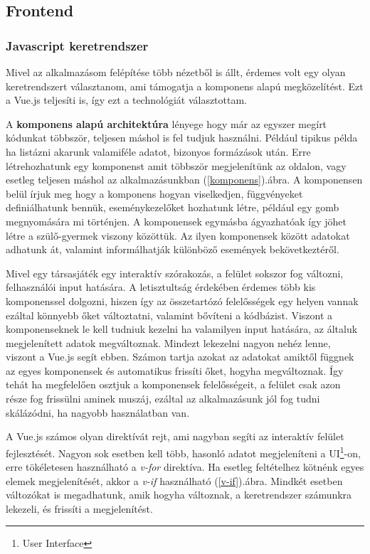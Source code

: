 \documentclass[a4paper,twoside]{article}
\begin{document}
\subsection{Frontend}

\subsubsection{Javascript keretrendszer}
Mivel az alkalmazásom felépítése több nézetből is állt, érdemes volt egy olyan keretrendszert választanom, ami támogatja a komponens 
alapú megközelítést. Ezt a  Vue.js\cite{vuejs} teljesíti is, így ezt a technológiát választottam. 

 A \textbf{komponens alapú architektúra} lényege hogy már az egyszer megírt kódunkat többször, teljesen máshol is fel tudjuk használni. Például tipikus példa 
ha listázni akarunk valamiféle adatot, bizonyos formázások után. Erre létrehozhatunk egy komponenst amit többször megjelenítünk az oldalon, vagy esetleg teljesen máshol az alkalmazásunkban (\ref{komponens}).ábra. A komponensen belül írjuk meg hogy a komponens hogyan viselkedjen, függvényeket definiálhatunk bennük, eseménykezelőket hozhatunk létre, például egy gomb megnyomására mi történjen. A komponensek egymásba ágyazhatóak így jöhet létre a szülő-gyermek viszony közöttük. Az ilyen komponensek között adatokat adhatunk át, valamint informálhatják különböző események bekövetkeztéről. 

Mivel egy társasjáték egy interaktív szórakozás, a felület sokszor fog változni, felhasználói input hatására. A letisztultság érdekében érdemes több kis komponenssel dolgozni, hiszen így az összetartózó felelősségek egy helyen vannak ezáltal könnyebb őket változtatni, valamint bővíteni a kódbázist. Viszont a komponenseknek le kell tudniuk kezelni ha valamilyen input hatására, az általuk megjelenített adatok megváltoznak. Mindezt lekezelni nagyon nehéz lenne, viszont a Vue.js segít ebben. Számon tartja azokat az adatokat amiktől függnek az egyes komponensek és automatikus frissíti őket, hogyha megváltoznak. Így tehát ha megfelelően osztjuk a komponensek felelősségeit, a felület csak azon része fog frissülni aminek muszáj, ezáltal az alkalmazásunk jól fog tudni skálázódni, ha nagyobb használatban van. 

A Vue.js számos olyan direktívát rejt, ami nagyban segíti az interaktív felület fejlesztését. Nagyon sok esetben kell több, hasonló adatot megjeleníteni a UI\footnote{User Interface}-on, erre tökéletesen használható a \textit{v-for} direktíva. Ha esetleg feltételhez kötnénk egyes elemek megjelenítését, akkor a \textit{v-if} használható (\ref{v-if}).ábra. Mindkét esetben változókat is megadhatunk, amik hogyha változnak, a keretrendszer számunkra lekezeli, és frissíti a megjelenítést.  
\end{document}
